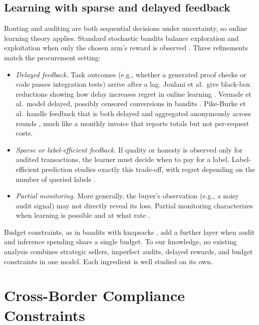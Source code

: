 \subsection{Learning with sparse and delayed feedback}\label{learning-with-sparse-and-delayed-feedback}

Routing and auditing are both sequential decisions under uncertainty, so online learning theory applies. Standard stochastic bandits balance exploration and exploitation when only the chosen arm's reward is observed \cite{auer2002ucb, lattimore2020bandit}. Three refinements match the procurement setting:

\begin{itemize}
\tightlist
\item
  \emph{Delayed feedback.} Task outcomes (e.g., whether a generated proof checks or code passes integration tests) arrive after a lag. Joulani et al.~give black-box reductions showing how delay increases regret in online learning \cite{joulani2013delayed}. Vernade et al.~model delayed, possibly censored conversions in bandits \cite{vernade2017delayed}. Pike-Burke et al.~handle feedback that is both delayed and aggregated anonymously across rounds \cite{pikeburke2018aggregated}, much like a monthly invoice that reports totals but not per-request costs.
\item
  \emph{Sparse or label-efficient feedback.} If quality or honesty is observed only for audited transactions, the learner must decide when to pay for a label. Label-efficient prediction studies exactly this trade-off, with regret depending on the number of queried labels \cite{cesabianchi2005label}.
\item
  \emph{Partial monitoring.} More generally, the buyer's observation (e.g., a noisy audit signal) may not directly reveal its loss. Partial monitoring characterizes when learning is possible and at what rate \cite{bartok2014partial}.
\end{itemize}

Budget constraints, as in bandits with knapsacks \cite{badanidiyuru2018bwk}, add a further layer when audit and inference spending share a single budget. To our knowledge, no existing analysis combines strategic sellers, imperfect audits, delayed rewards, and budget constraints in one model. Each ingredient is well studied on its own.

\section{Cross-Border Compliance Constraints}\label{cross-border-compliance-constraints}

